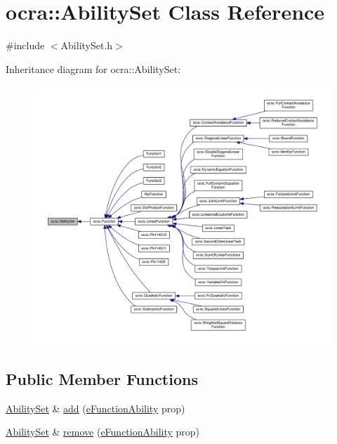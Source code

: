 \hypertarget{classocra_1_1AbilitySet}{}\section{ocra\+:\+:Ability\+Set Class Reference}
\label{classocra_1_1AbilitySet}


{\ttfamily \#include $<$Ability\+Set.\+h$>$}



Inheritance diagram for ocra\+:\+:Ability\+Set\+:
\nopagebreak
\begin{figure}[H]
\begin{center}
\leavevmode
\includegraphics[width=350pt]{d4/d5b/classocra_1_1AbilitySet__inherit__graph}
\end{center}
\end{figure}
\subsection*{Public Member Functions}
\begin{DoxyCompactItemize}
\item 
\hyperlink{classocra_1_1AbilitySet}{Ability\+Set} \& \hyperlink{classocra_1_1AbilitySet_a4ce141c59ed38f812a4216730a0c4685}{add} (\hyperlink{namespaceocra_a40ddbec106a6034cd2047bba9945b568}{e\+Function\+Ability} prop)
\item 
\hyperlink{classocra_1_1AbilitySet}{Ability\+Set} \& \hyperlink{classocra_1_1AbilitySet_a093633f29e0d5e6a388d9b8cba9224c7}{remove} (\hyperlink{namespaceocra_a40ddbec106a6034cd2047bba9945b568}{e\+Function\+Ability} prop)
\end{DoxyCompactItemize}
